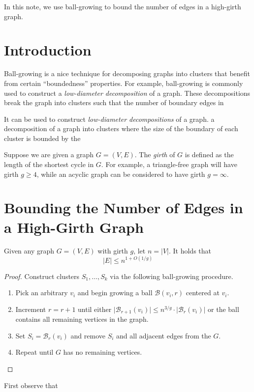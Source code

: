 \documentclass[9pt]{article}
\begin{document}

In this note, we use ball-growing to bound the number of edges in a high-girth graph.

\section{Introduction}

Ball-growing is a nice technique for decomposing graphs into clusters that benefit from certain ``boundedness'' properties. For example, ball-growing is commonly used to construct a \emph{low-diameter decomposition} of a graph. These decompositions break the graph into clusters such that the number of boundary edges in


It can be used to construct \emph{low-diameter decompositions} of a graph.  a decomposition of a graph into clusters where the size of the boundary of each cluster is bounded by the



Suppose we are given a graph $G = (V, E)$. The \emph{girth} of $G$ is defined as the length of the shortest cycle in $G$. For example, a triangle-free graph will have girth $g \geq 4$, while an acyclic graph can be considered to have girth $g = \infty$.


\section{Bounding the Number of Edges in a High-Girth Graph}

\begin{claim}
Given any graph $G = (V, E)$ with girth $g$, let $n = \lvert V \rvert$. It holds that
\begin{equation*}
\lvert E \rvert \leq n^{1 + O(1/g)}
\end{equation*}
\end{claim}
\begin{proof}
Construct clusters $S_1, \ldots, S_k$ via the following ball-growing procedure.
\vspace{-1em}
\begin{enumerate}[1.]
\item Pick an arbitrary $v_i$ and begin growing a ball $\mathcal{B}(v_i, r)$ centered at $v_i$.

\item Increment $r = r + 1$ until either $\lvert \mathcal{B}_{r+1}(v_i) \rvert \leq n^{3/g} \cdot \lvert \mathcal{B}_{r}(v_i) \rvert$ or the ball contains all remaining vertices in the graph.

\item Set $S_i = \mathcal{B}_r(v_i)$ and remove $S_i$ and all adjacent edges from the $G$.

\item Repeat until $G$ has no remaining vertices.
\end{enumerate}
\end{proof}

First observe that
\end{document}
